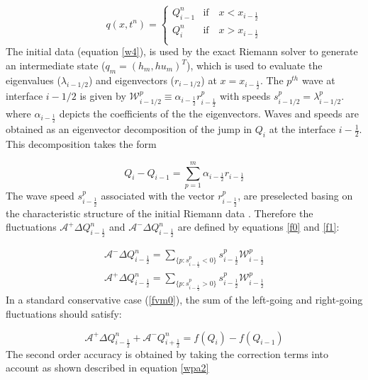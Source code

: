 \documentclass[12pt,a4paper]{article}
\newcommand{\donna}[1]{{\color{red}{#1}}}
\begin{document}
{	\begin{equation}
		q(x,t^n)  = \begin{cases}
			Q_{i-1}^{n}  & \text{if} \quad  x < x_{i-\frac{1}{2}}\\
			Q_{i}^{n} & \text{if} \quad x > x_{i-\frac{1}{2}}\\
		\end{cases}    
		\label{w4}   
	\end{equation}
	The initial data (equation \eqref{w4}), is used by the exact Riemann solver to generate an intermediate state ($q_m = (h_m, hu_m)^T$), which is used to evaluate the eigenvalues ($\lambda_{i-1/2}$) and eigenvectors ($r_{i-1/2}$) at $x = x_{i-\frac{1}{2}}$. The $p^{th}$ wave at interface $i-1/2$ is given by $\mathcal W^p_{i-1/2} \equiv \alpha_{i-\frac{1}{2}} r^p_{i-\frac{1}{2}}$ with speeds $s^p_{i-1/2} = \lambda^p_{i-1/2}$\cite{leveque2002finite}. where $ \alpha_{i-\frac{1}{2}}$ depicts the coefficients of the the eigenvectors.  Waves and speeds are obtained as an eigenvector decomposition of the jump in $Q_i$ at the interface $i-\frac{1}{2}$.  This decomposition takes the form
	
	\begin{equation}
		Q_{i} -  Q_{i-1} = \sum_{p=1}^{m}  \alpha_{i-\frac{1}{2}} r_{i-\frac{1}{2}}
		\label{wpa19}
	\end{equation}
	The wave speed $s_{i-\frac{1}{2}}^{p}$ associated with the vector $r_{i-\frac{1}{2}}^{p}$, are preselected basing on the characteristic structure of the initial Riemann data \cite{ge:2008}. Therefore the fluctuations $\mathcal{A^{+}}\Delta Q_{i-\frac{1}{2}}^{n}$  and $\mathcal{A^{-}}\Delta Q_{i-\frac{1}{2}}^{n} $ are defined by equations \eqref{f0} and \eqref{f1}:
	
	\begin{eqnarray}
		\mathcal{A^{-}}\Delta Q_{i-\frac{1}{2}}^{n} = \sum_{\{ p:s_{i-\frac{1}{2}}^{p}<0\}} s_{i-\frac{1}{2}}^{p} \mathcal{W}_{i-\frac{1}{2}}^{p}
		\label{f0}\\
		\mathcal{A^{+}}\Delta Q_{i-\frac{1}{2}}^{n} =\sum_{\{ p:s_{i-\frac{1}{2}}^{p}>0\}} s_{i-\frac{1}{2}}^{p} \mathcal{W}_{i-\frac{1}{2}}^{p}
		\label{f1}
	\end{eqnarray}
	In a standard  conservative case (\eqref{fvm0}), the sum of the left-going and right-going fluctuations should satisfy:
	
	\begin{equation}
		\mathcal{A^{+}}\Delta 	Q_{i-\frac{1}{2}}^{n} + \mathcal{A^{-}}Q_{i+\frac{1}{2}}^{n} = f(Q_{i}) - f(Q_{i-1})
	\end{equation}
	The second order accuracy is obtained by taking the correction terms into account as shown described in equation \eqref{wpa2}
	
}
\end{document}

